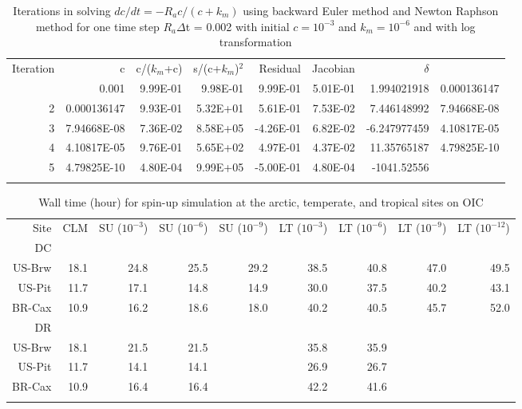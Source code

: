 \documentclass[gmd, manuscript]{copernicus}
\begin{document}
\begin{table}[t]
\caption{Iterations in solving $dc/dt=-R_ac/(c+k_m)$ using backward Euler method
and Newton Raphson method for one time step $R_a\Delta$t = 0.002 with
initial $c=10^{-3}$ and $k_m=10^{-6}$ and with log transformation}
\label{table4}
\begin{tabular}{rrrrrrrr}
\tophline
Iteration& c &	c/($k_m$+c)& s/(c+$k_m$)$^2$ & Residual	& Jacobian & $\delta$ \\
\middlehline
1 & 0.001 & 9.99E-01 & 9.98E-01 & 9.99E-01 & 5.01E-01 & 1.994021918 & 0.000136147 \\
2 & 0.000136147 & 9.93E-01 & 5.32E+01 & 5.61E-01 & 7.53E-02 & 7.446148992 & 7.94668E-08 \\
3 & 7.94668E-08 & 7.36E-02 & 8.58E+05 & -4.26E-01 & 6.82E-02 & -6.247977459 & 4.10817E-05 \\
4 & 4.10817E-05 & 9.76E-01 & 5.65E+02 &	4.97E-01 & 4.37E-02 & 11.35765187 & 4.79825E-10 \\
5 & 4.79825E-10 & 4.80E-04 & 9.99E+05 & -5.00E-01 & 4.80E-04 & -1041.52556 &  \\
\bottomhline
\end{tabular}
\end{table}

\begin{table}[t]
\caption{Wall time (hour) for spin-up simulation at the arctic, temperate, and tropical sites on OIC}
\label{tab:computingtime}
\begin{tabular}{rrrrrrrrr}
\tophline
Site & CLM  & SU ($10^{-3}$) & SU ($10^{-6}$) & SU ($10^{-9}$) & LT ($10^{-3}$) & LT ($10^{-6}$) & LT ($10^{-9}$) & LT ($10^{-12}$)\\
DC\\
US-Brw & 18.1 & 24.8 & 25.5 & 29.2 & 38.5 & 40.8 & 47.0 & 49.5 \\
US-Pit & 11.7 & 17.1 & 14.8 & 14.9 & 30.0 & 37.5 & 40.2 & 43.1 \\
BR-Cax & 10.9 & 16.2 & 18.6 & 18.0 & 40.2 & 40.5 & 45.7 & 52.0 \\
\middlehline
DR\\
US-Brw & 18.1 & 21.5 & 21.5 &      & 35.8 & 35.9 & \\
US-Pit & 11.7 & 14.1 & 14.1 &      & 26.9 & 26.7 & \\
BR-Cax & 10.9 & 16.4 & 16.4 &      & 42.2 & 41.6 & \\
\bottomhline
\end{tabular}
\end{table}
\end{document}
